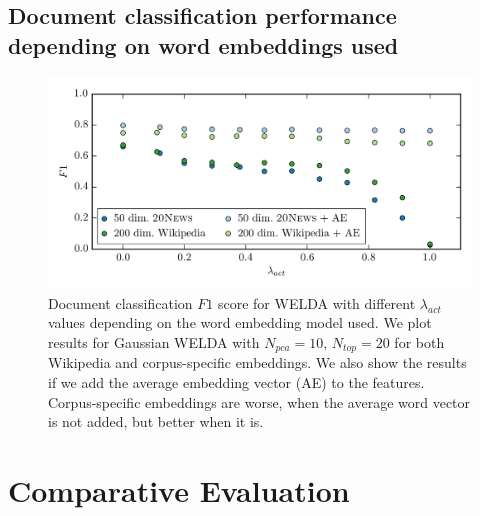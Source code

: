 \documentclass[
        a4paper,
        titlepage,
        twoside,
        parskip,
        numbers=noenddot
        ]{scrbook}
\theoremstyle{break}
\begin{document}
\begin{appendices}
  \subsection{Document classification performance depending on word embeddings used}
  \label{sec:appendix_welda_dc_different_embeddings}
  \begin{figure}
         \centering
         \includegraphics[width=14cm]{figures/welda_dc_different_embeddings.png}
         \caption{Document classification $F1$ score for WELDA with different $\lambda_{act}$ values depending on the word embedding model used. We plot results for Gaussian WELDA with $N_{pca} = 10$, $N_{top} = 20$ for both Wikipedia and corpus-specific embeddings. We also show the results if we add the average embedding vector (AE) to the features. Corpus-specific embeddings are worse, when the average word vector is not added, but better when it is.}
         \label{fig:welda_dc_different_embeddings}
  \end{figure}


  \section{Comparative Evaluation}

\end{appendices}
\end{document}
